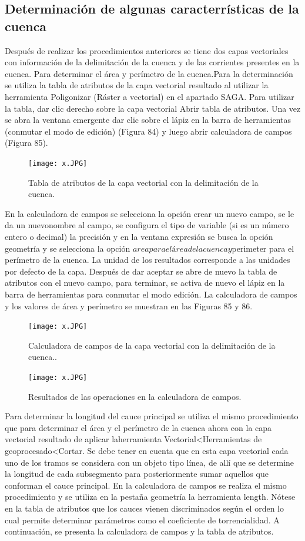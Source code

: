 \documentclass[12pt,hidelinks]{article}
\begin{document}
\subsection{Determinación de algunas caracterrísticas de la cuenca}

Después de realizar los procedimientos anteriores se tiene dos capas vectoriales con información de la delimitación de la cuenca y de las corrientes presentes en la cuenca. Para determinar el área y perímetro de la cuenca.Para la determinación se utiliza la tabla de atributos de la capa vectorial resultado al utilizar la herramienta Poligonizar (Ráster a vectorial) en el apartado SAGA. Para utilizar la tabla, dar clic derecho sobre la capa vectorial Abrir tabla de atributos. Una vez se abra la ventana emergente dar clic sobre el lápiz en la barra de herramientas (conmutar el modo de edición) (Figura 84) y luego abrir calculadora de campos (Figura 85).
\begin{figure}[H]
    \centering
    \texttt{[image: x.JPG]}
    \caption{Tabla de atributos de la capa vectorial con la delimitación de la cuenca.}
 \label{fig:my_label}
\end{figure}
En la calculadora de campos se selecciona la opción crear un nuevo campo, se le da un nuevonombre al campo, se configura el tipo de variable (si es un número entero o decimal) la precisión y en la ventana expresión se busca la opción geometría y se selecciona la opción $area para el área de la cuenca y $perimeter para el perímetro de la cuenca. La unidad de los resultados corresponde a las unidades por defecto de la capa. Después de dar aceptar se abre de nuevo la tabla de atributos con el nuevo campo, para terminar, se activa de nuevo el lápiz en la barra de herramientas para conmutar el modo edición. La calculadora de campos y los valores de área y perímetro se muestran en las Figuras 85 y 86.
\begin{figure}[H]
    \centering
    \texttt{[image: x.JPG]}
    \caption{Calculadora de campos de la capa vectorial con la delimitación de la cuenca..}
 \label{fig:my_label}
\end{figure}
\begin{figure}[H]
    \centering
    \texttt{[image: x.JPG]}
    \caption {Resultados de las operaciones en la calculadora de campos.}
 \label{fig:my_label}
\end{figure}
Para determinar la longitud del cauce principal se utiliza el mismo procedimiento que para determinar el área y el perímetro de la cuenca ahora con la capa vectorial resultado de aplicar laherramienta Vectorial<Herramientas de geoprocesado<Cortar. Se debe tener en cuenta que en esta capa vectorial cada uno de los tramos se considera con un objeto tipo línea, de allí que se determine la longitud de cada subsegmento para posteriormente sumar aquellos que conforman el cauce principal. En la calculadora de campos se realiza el mismo procedimiento y se utiliza en la pestaña geometría la herramienta length. Nótese en la tabla de atributos que los cauces vienen discriminados según el orden lo cual permite determinar parámetros como el coeficiente de torrencialidad. A continuación, se presenta la calculadora de campos y la tabla de atributos.
\end{document}
